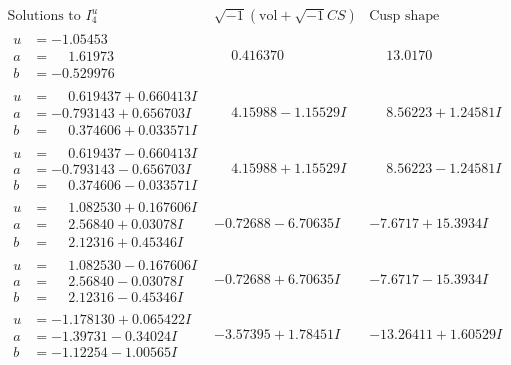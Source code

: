 \documentclass[1p]{elsarticle_modified}
\theoremstyle{definition}
\newcommand{\I}{\sqrt{-1}}
\begin{document}
$$\begin{array}{c|c|c}  
\text{Solutions to }I^u_{4}& \I (\text{vol} + \sqrt{-1}CS) & \text{Cusp shape}\\
 \hline 
\begin{aligned}
u &= -1.05453\phantom{ +0.000000I} \\
a &= \phantom{-}1.61973\phantom{ +0.000000I} \\
b &= -0.529976\phantom{ +0.000000I}\end{aligned}
 & \phantom{-}0.416370\phantom{ +0.000000I} & \phantom{-}13.0170\phantom{ +0.000000I} \\ \hline\begin{aligned}
u &= \phantom{-}0.619437 + 0.660413 I \\
a &= -0.793143 + 0.656703 I \\
b &= \phantom{-}0.374606 + 0.033571 I\end{aligned}
 & \phantom{-}4.15988 - 1.15529 I & \phantom{-}8.56223 + 1.24581 I \\ \hline\begin{aligned}
u &= \phantom{-}0.619437 - 0.660413 I \\
a &= -0.793143 - 0.656703 I \\
b &= \phantom{-}0.374606 - 0.033571 I\end{aligned}
 & \phantom{-}4.15988 + 1.15529 I & \phantom{-}8.56223 - 1.24581 I \\ \hline\begin{aligned}
u &= \phantom{-}1.082530 + 0.167606 I \\
a &= \phantom{-}2.56840 + 0.03078 I \\
b &= \phantom{-}2.12316 + 0.45346 I\end{aligned}
 & -0.72688 - 6.70635 I & -7.6717 + 15.3934 I \\ \hline\begin{aligned}
u &= \phantom{-}1.082530 - 0.167606 I \\
a &= \phantom{-}2.56840 - 0.03078 I \\
b &= \phantom{-}2.12316 - 0.45346 I\end{aligned}
 & -0.72688 + 6.70635 I & -7.6717 - 15.3934 I \\ \hline\begin{aligned}
u &= -1.178130 + 0.065422 I \\
a &= -1.39731 - 0.34024 I \\
b &= -1.12254 - 1.00565 I\end{aligned}
 & -3.57395 + 1.78451 I & -13.26411 + 1.60529 I \\ \hline\begin{aligned}

\end{aligned}
\end{array}$$
\end{document}
